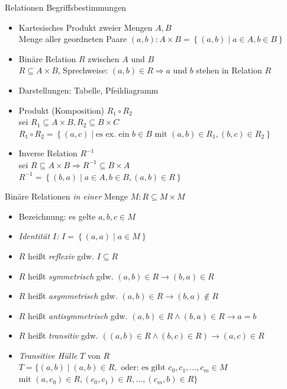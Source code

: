 \begin{frame}{Relationen}
	Begriffsbestimmungen
	\begin{itemize}
		\item Kartesisches Produkt zweier Mengen $A, B$\\
			Menge aller geordneten Paare $(a,b): A \times B = \left\{(a,b) \mid a \in A, b \in B\right\}$
		\item Binäre Relation $R$ zwischen $A$ und $B$\\
			$R \subseteq A \times B$, Sprechweise: $(a,b) \in R \Rightarrow a$ und $b$ stehen in Relation $R$
		\item Darstellungen: Tabelle, Pfeildiagramm
		\item Produkt (Komposition) $R_1 \circ R_2$\\
			sei $R_1 \subseteq A \times B, R_2 \subseteq B \times C$\\
			$R_1 \circ R_2 = \left\{(a,c) \mid \textrm{es ex. ein } b \in B \textrm{ mit } (a,b) \in R_1, (b,c) \in R_2\right\}$
		\item Inverse Relation $R^{-1}$\\
			sei $R \subseteq A \times B \Rightarrow R^{-1}\subseteq B \times A$\\
			$R^{-1}=\left\{(b,a) \mid a \in A, b \in B, (a,b) \in R\right\}$
	\end{itemize}
\end{frame}

\begin{frame}{Binäre Relationen \emph{in einer} Menge $M: R \subseteq M \times M$}
	\begin{itemize}
		\item Bezeichnung: es gelte $a,b,c \in M$
		\item \emph{Identität $I$:} $I=\left\{(a,a) \mid a \in M\right\}$
		\item $R$ heißt \emph{reflexiv} gdw. $I \subseteq R$
		\item $R$ heißt \emph{symmetrisch} gdw. $(a,b) \in R \rightarrow (b,a) \in R$
		\item $R$ heißt \emph{asymmetrisch} gdw. $(a,b) \in R \rightarrow (b,a) \notin R$
		\item $R$ heißt \emph{antisymmetrisch} gdw. $(a,b) \in R \land (b,a) \in R \rightarrow a = b$
		\item $R$ heißt \emph{transitiv} gdw. $((a,b) \in R \land (b,c) \in R) \rightarrow (a,c) \in R$
		\item \emph{Transitive Hülle} $T$ von $R$\\
			$T=\{(a,b) \mid (a,b) \in R, \textrm{ oder: es gibt } c_0, c_1, \ldots, c_m \in M$\\
			$\textrm{mit } (a,c_0) \in R, (c_0, c_1) \in R, \ldots, (c_m,b) \in R\}$
	\end{itemize}
\end{frame}


